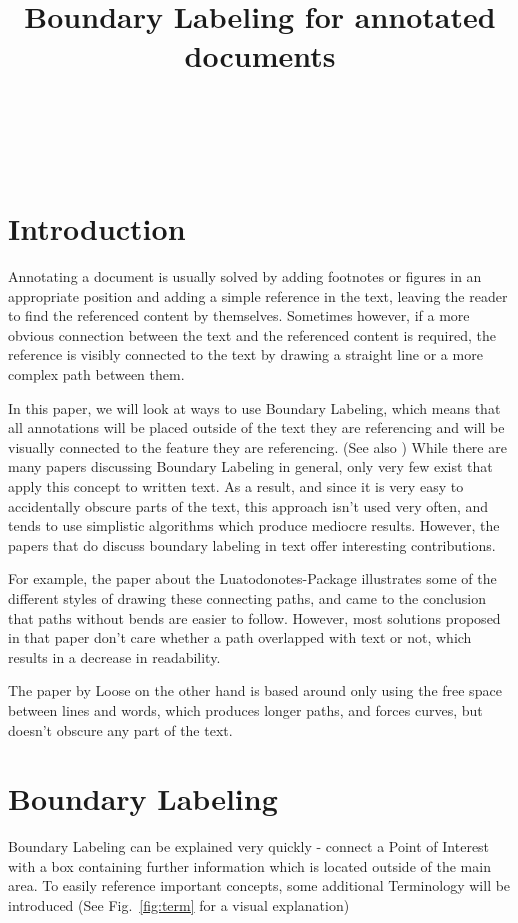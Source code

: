 \documentclass[11pt,a4paper]{article}
\title{Boundary Labeling for annotated documents}%
\author{
 \authorname{Jakob Klinger} \\
 \studentnumber{1125755} \\
 \curriculum{033 534} \\
 \email{e1125755@student.tuwien.ac.at}
}
\begin{document}
\maketitle


\section{Introduction}
Annotating a document is usually solved by adding footnotes or figures in an appropriate position and adding a simple reference in the text, leaving the reader to find the referenced content by themselves. Sometimes however, if a more obvious connection between the text and the referenced content is required, the reference is visibly connected to the text by drawing a straight line or a more complex path between them.

In this paper, we will look at ways to use Boundary Labeling, which means that all annotations will be placed outside of the text they are referencing and will be visually connected to the feature they are referencing. (See also \cite{Bekos2007}) While there are many papers discussing Boundary Labeling in general, only very few exist that apply this concept to written text. As a result, and since it is very easy to accidentally obscure parts of the text, this approach isn't used very often, and tends to use simplistic algorithms which produce mediocre results.
However, the papers that do discuss boundary labeling in text offer interesting contributions.

For example, the paper about the Luatodonotes-Package\cite{Kindermann2014} illustrates some of the different styles of drawing these connecting paths, and came to the conclusion that paths without bends are easier to follow. %
However, most solutions proposed in that paper don't care whether a path overlapped with text or not, which results in a decrease in readability.

The paper by Loose\cite{Loose2015} on the other hand is based around only using the free space between lines and words, which produces longer paths, and forces curves, but doesn't obscure any part of the text.



\section{Boundary Labeling} %
Boundary Labeling can be explained very quickly -  connect a Point of Interest with a box containing further information which is located outside of the main area. To easily reference important concepts, some additional Terminology will be introduced (See Fig.~\ref{fig:term} for a visual explanation)
\end{document}
